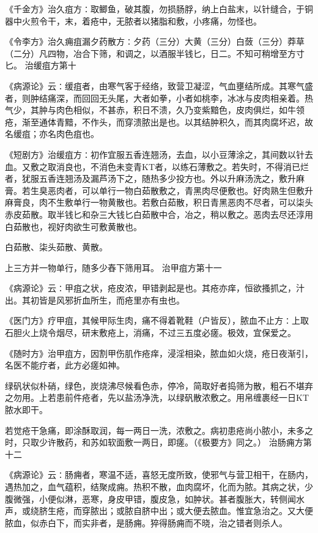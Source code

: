 \documentclass[a4paper,12pt,UTF8,twoside]{ctexbook}
\begin{document}
《千金方》治久疽方∶取鲫鱼，破其腹，勿损肠脬，纳上白盐末，以针缝合，于铜器中火煎令干，末，着疮中，无脓者以猪脂和敷，小疼痛，勿怪也。

《令李方》治久痈疽漏夕药散方∶夕药（三分）大黄（三分）白蔹（三分）莽草（二分）凡四物，冶合下筛，和调之，以酒服半钱匕，日二。不知可稍增至方寸匕。
治缓疽方第十

《病源论》云∶缓疽者，由寒气客于经络，致营卫凝涩，气血壅结所成。其寒气盛者，则肿结痛深，而回回无头尾，大者如拳，小者如桃李，冰冰与皮肉相亲着。热气少，其肿与肉色相似，不甚赤，积日不溃，久乃变紫黯色，皮肉俱烂，如牛领疮，渐至通体青黯，不作头，而穿溃脓出是也。以其结肿积久，而其肉腐坏迟，故名缓疽；亦名肉色疽也。

《短剧方》治缓疽方∶初作宜服五香连翘汤，去血，以小豆薄涂之，其间数以针去血。又敷之取消良也，不消色未变青KT者，以练石薄敷之。若失时，不得消已烂者，犹服五香连翘汤及漏芦汤下之，随热多少投方也。外以升麻汤洗之，敷升麻膏。若生臭恶肉者，可以单行一物白茹散敷之，青黑肉尽便敷也。好肉熟生但敷升麻膏良，肉不生敷单行一物黄散也。若敷白茹散，积日青黑恶肉不尽者，可以柒头赤皮茹散。取半钱匕和杂三大钱匕白茹散中合，冶之，稍以敷之。恶肉去尽还淳用白茹散也，视好肉欲生可敷黄散也。

白茹散、柒头茹散、黄散。

上三方并一物单行，随多少舂下筛用耳。
治甲疽方第十一

《病源论》云∶甲疽之状，疮皮浓，甲错剥起是也。其疮亦痒，恒欲搔抓之，汁出。其初皆是风邪折血所生，而疮里亦有虫也。

《医门方》疗甲疽，其候甲际生肉，痛不得着靴鞋（户皆反），脓血不止方∶上取石胆火上烧令烟尽，研末敷疮上，消痛，不过三五度必瘥。极效，宜保爱之。

《随时方》治甲疽方，因割甲伤肌作疮痒，浸淫相染，脓血如火烧，疮日夜渐引，名医不能疗者，此方必瘥如神。

绿矾状似朴硝，绿色，炭烧沸尽候看色赤，停冷，简取好者捣筛为散，粗石不堪弃之勿用。上若患前件疮者，先以盐汤净洗，以绿矾散浓敷之。用帛缠裹经一日KT脓水即干。

若觉疮干急痛，即涂酥取润，每一两日一洗，浓敷之。病初患疮尚小脓小，未多之时，只取少许散药，和苏如软面敷一两日，即瘥。（《极要方》同之。）
治肠痈方第十二

《病源论》云∶肠痈者，寒温不适，喜怒无度所致，使邪气与营卫相干，在肠内，遇热加之，血气蕴积，结聚成痈。热积不散，血肉腐坏，化而为脓。其病之状，少腹微强，小便似淋，恶寒，身皮甲错，腹皮急，如肿状。甚者腹胀大，转侧闻水声，或绕脐生疮，而穿脓出；或脓自脐中出；或大便去脓血。惟宜急治之。又大便脓血，似赤白下，而实非者，是肠痈。猝得肠痈而不晓，治之错者则杀人。
\end{document}
